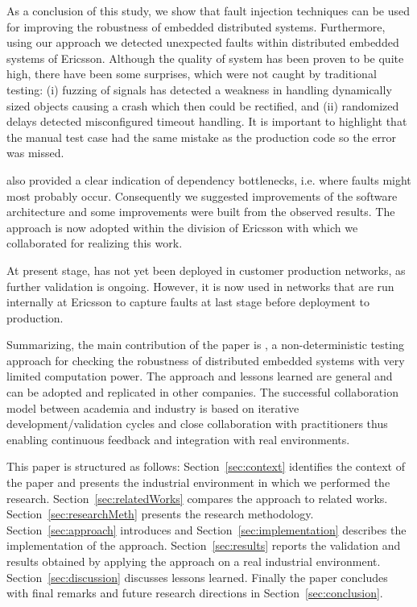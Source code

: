 As a conclusion of this study, we show that fault injection techniques can be used for improving the robustness of embedded distributed
systems. Furthermore, using our approach we detected unexpected faults within distributed embedded systems of Ericsson. 
Although the quality of system has been proven to be quite high, there have been some surprises, which were not caught by traditional testing: (i) fuzzing of signals has detected a weakness in handling dynamically sized objects causing a crash which then could be rectified, and (ii) randomized delays detected misconfigured timeout handling. It is important to highlight that the manual test case had the same mistake as the production code so the error was missed.

\approach{} also provided a clear indication of dependency bottlenecks, i.e. where faults might most probably occur. Consequently we suggested improvements of the software architecture and some %
improvements
were built from the observed results. The approach is now adopted within the division of Ericsson with which we collaborated for realizing this work.
 
At present stage, \approach{} has not yet been deployed in customer production networks, as further validation is ongoing. However, it is now used in networks that are run internally at Ericsson to capture faults at last stage before deployment to production. 
 
Summarizing, the main contribution of the paper is \approach{}, a non-deterministic testing approach for checking the robustness of distributed embedded systems with very limited computation power. The approach and lessons learned are general and can be adopted and replicated in other companies.
The successful collaboration model between academia and industry is based on iterative development/validation cycles and close collaboration with practitioners thus enabling continuous feedback and integration with real environments. 

This paper is structured as follows: Section~\ref{sec:context} identifies the context of the paper and presents the industrial environment in which we performed the research. Section~\ref{sec:relatedWorks} compares the approach to related works. Section~\ref{sec:researchMeth} presents the research methodology. Section~\ref{sec:approach} introduces  %
\approach{} and Section~\ref{sec:implementation} describes the implementation of the approach. Section~\ref{sec:results} reports the validation and results obtained by applying the approach on a real industrial environment. Section~\ref{sec:discussion} discusses lessons learned. Finally the paper concludes with final remarks and future research directions in Section~\ref{sec:conclusion}.

